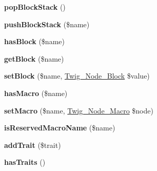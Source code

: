 \begin{DoxyCompactItemize}
\item 
{\bfseries pop\+Block\+Stack} ()\hypertarget{classTwig__Parser_aa48463e55b5d61153202170cdbf7dd58}{}\label{classTwig__Parser_aa48463e55b5d61153202170cdbf7dd58}

\item 
{\bfseries push\+Block\+Stack} (\$name)\hypertarget{classTwig__Parser_a07e264d63f3844f0cb33afdb41a917b3}{}\label{classTwig__Parser_a07e264d63f3844f0cb33afdb41a917b3}

\item 
{\bfseries has\+Block} (\$name)\hypertarget{classTwig__Parser_a15542c43a1902ceaefecfcd122a1345b}{}\label{classTwig__Parser_a15542c43a1902ceaefecfcd122a1345b}

\item 
{\bfseries get\+Block} (\$name)\hypertarget{classTwig__Parser_ac5bc0b739656b3a7a3dc80f928f3ca51}{}\label{classTwig__Parser_ac5bc0b739656b3a7a3dc80f928f3ca51}

\item 
{\bfseries set\+Block} (\$name, \hyperlink{classTwig__Node__Block}{Twig\+\_\+\+Node\+\_\+\+Block} \$value)\hypertarget{classTwig__Parser_a96917fc31bfa5f76c76a906cff0c9c6d}{}\label{classTwig__Parser_a96917fc31bfa5f76c76a906cff0c9c6d}

\item 
{\bfseries has\+Macro} (\$name)\hypertarget{classTwig__Parser_ad40adb468f0b33454e055c32d88540fb}{}\label{classTwig__Parser_ad40adb468f0b33454e055c32d88540fb}

\item 
{\bfseries set\+Macro} (\$name, \hyperlink{classTwig__Node__Macro}{Twig\+\_\+\+Node\+\_\+\+Macro} \$node)\hypertarget{classTwig__Parser_a4694fcfd31b64729a8468dda4ca606e3}{}\label{classTwig__Parser_a4694fcfd31b64729a8468dda4ca606e3}

\item 
{\bfseries is\+Reserved\+Macro\+Name} (\$name)\hypertarget{classTwig__Parser_ae9c75efbbc989af2b0a57dca0b8dc3ba}{}\label{classTwig__Parser_ae9c75efbbc989af2b0a57dca0b8dc3ba}

\item 
{\bfseries add\+Trait} (\$trait)\hypertarget{classTwig__Parser_a05d37cab6308bea96a80d15087b633b4}{}\label{classTwig__Parser_a05d37cab6308bea96a80d15087b633b4}

\item 
{\bfseries has\+Traits} ()\hypertarget{classTwig__Parser_a73cac273cc08ab9d29b6f8c0df388004}{}\label{classTwig__Parser_a73cac273cc08ab9d29b6f8c0df388004}


\end{DoxyCompactItemize}
